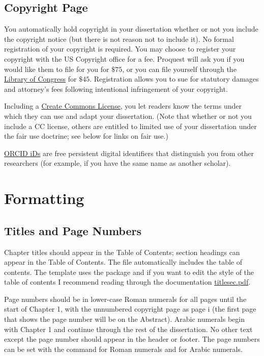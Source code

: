 \documentclass[12pt]{report}
\begin{document}
\section{Copyright Page}
You automatically hold copyright in your dissertation whether or not you include the copyright notice (but there is not reason not to include it). No formal registration of your copyright is required. You may choose to register your copyright with the US Copyright office for a fee. Proquest will ask you if you would like them to file for you for $\$75$, or you can file yourself through the \href{https://www.copyright.gov/registration/}{Library of Congress} for $\$45$. Registration allows you to sue for statutory damages and attorney's fees following intentional infringement of your copyright.

Including a \href{https://creativecommons.org/licenses/}{Create Commons License}, you let readers know the terms under which they can use and adapt your dissertation. (Note that whether or not you include a CC license, others are entitled to limited use of your dissertation under the fair use doctrine; see below for links on fair use.)

\href{https://orcid.org/}{ORCID iDs} are free persistent digital identifiers that distinguish you from other researchers (for example, if you have the same name as another scholar).


\chapter{Formatting}
\section{Titles and Page Numbers}
Chapter titles should appear in the Table of Contents; section headings can appear in the Table of Contents. The  file automatically includes the table of contents. The template uses the  package and if you want to edit the style of the table of contents I recommend reading through the documentation \href{https://github.com/cacsphysics/BMC_Template_Info_Files/blob/main/titlesec.pdf}{titlesec.pdf}. 

Page numbers should be in lower-case Roman numerals for all pages until the start of Chapter 1, with the unnumbered copyright page as page i (the first page that shows the page number will be on the Abstract). Arabic numerals begin with Chapter 1 and continue through the rest of the dissertation. No other text except the page number should appear in the header or footer. The page numbers can be set with the command  for Roman numerals and  for Arabic numerals.
\end{document}
